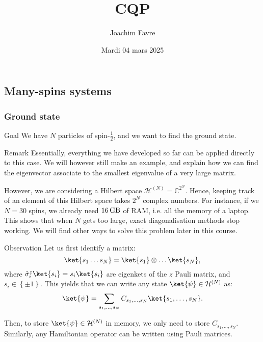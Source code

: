 \documentclass[a4paper]{article}
\title{CQP}
\author{Joachim Favre}
\date{Mardi 04 mars 2025}
\begin{document}
\maketitle


\subsection{Many-spins systems}
\subsubsection{Ground state}

\begin{parag}{Goal}
    We have $N$ particles of spin-$\frac{1}{2}$, and we want to find the ground state.

    \begin{subparag}{Remark}
        Essentially, everything we have developed so far can be applied directly to this case. We will however still make an example, and explain how we can find the eigenvector associate to the smallest eigenvalue of a very large matrix.
        
        However, we are considering a Hilbert space $\mathcal{H}^{\left(N\right)} = \mathbb{C}^{2^N}$. Hence, keeping track of an element of this Hilbert space takes $2^N$ complex numbers. For instance, if we $N = 30$ spins, we already need $\SI{16}{\giga\byte }$ of RAM, i.e. all the memory of a laptop. This shows that when $N$ gets too large, exact diagonalisation methods stop working. We will find other ways to solve this problem later in this course.
    \end{subparag}

    \begin{subparag}{Observation}
        Let us first identify a matrix:
        \[\ket{s_1 \ldots s_N} = \ket{s_1} \otimes \ldots \ket{s_N},\]
        where $\hat{\sigma}_i^z \ket{s_i} = s_i \ket{s_i}$ are eigenkets of the $z$ Pauli matrix, and $s_i \in \left\{\pm 1\right\}$. This yields that we can write any state $\ket{\psi} \in \mathcal{H}^{\left(N\right)}$ as: 
        \[\ket{\psi} = \sum_{s_1, \ldots, s_N} C_{s_1, \ldots, s_N} \ket{s_1, \ldots, s_N}.\]

        Then, to store $\ket{\psi} \in \mathcal{H}^{\left(N\right)}$ in memory, we only need to store $C_{s_1, \ldots, s_N}$. Similarly, any Hamiltonian operator can be written using Pauli matrices.
    \end{subparag}
\end{parag}
\end{document}
